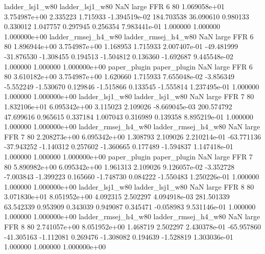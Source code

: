     ladder_lsj1_w80     ladder_lsj1_w80                   NaN      large      FFR                 6 80 1.069058e+01   3.754987e+00      2.335223       1.715933 -1.394519e-02    184.703538     36.090610     0.980133       0.330012  1.047757   0.297945     0.256354   7.983441e-01            1.000000        1.000000        1.000000e+00
ladder_rmsej_h4_w80 ladder_rmsej_h4_w80                   NaN      large      FFR                 6 80 1.896944e+00   3.754987e+00      1.168953       1.715933  2.007407e-01    -49.481999    -31.876530    -1.308455       0.194513 -1.504812   0.136360    -1.692687   9.445548e-02            1.000000        1.000000        1.000000e+00
       paper_plugin        paper_plugin                   NaN      large      FFR                 6 80 3.610182e+00   3.754987e+00      1.620660       1.715933  7.655048e-02     -3.856349     -5.552249    -1.530670       0.129846 -1.515866   0.133545    -1.555814   1.237495e-01            1.000000        1.000000        1.000000e+00
    ladder_lsj1_w80     ladder_lsj1_w80                   NaN      large      FFR                 7 80 1.832106e+01   6.095342e+00      3.115023       2.109026 -8.669045e-03    200.574792     47.699616     0.965615       0.337184  1.007043   0.316989     0.139358   8.895219e-01            1.000000        1.000000        1.000000e+00
ladder_rmsej_h4_w80 ladder_rmsej_h4_w80                   NaN      large      FFR                 7 80 2.208273e+00   6.095342e+00      1.308793       2.109026  2.210214e-01    -63.771136    -37.943252    -1.140312       0.257602 -1.360665   0.177489    -1.594837   1.147418e-01            1.000000        1.000000        1.000000e+00
       paper_plugin        paper_plugin                   NaN      large      FFR                 7 80 5.890982e+00   6.095342e+00      1.961313       2.109026  9.126057e-02     -3.352728     -7.003843    -1.399223       0.165660 -1.748730   0.084222    -1.550483   1.250226e-01            1.000000        1.000000        1.000000e+00
    ladder_lsj1_w80     ladder_lsj1_w80                   NaN      large      FFR                 8 80 3.071830e+01   8.051952e+00      4.092315       2.502297  4.094918e-03    281.501339     63.542339     0.953909       0.343039  0.949087   0.345471    -0.058983   9.531146e-01            1.000000        1.000000        1.000000e+00
ladder_rmsej_h4_w80 ladder_rmsej_h4_w80                   NaN      large      FFR                 8 80 2.741057e+00   8.051952e+00      1.468719       2.502297  2.430378e-01    -65.957860    -41.305163    -1.112081       0.269476 -1.308082   0.194639    -1.528819   1.303036e-01            1.000000        1.000000        1.000000e+00
